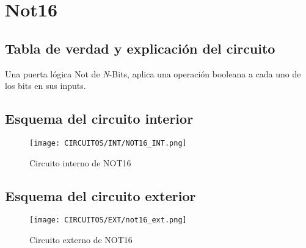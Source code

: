 \documentclass[12pt]{article}
\begin{document}
\section{Not16}
    \subsection{Tabla de verdad y explicación del circuito}

    Una puerta lógica Not de \textit{N}-Bits, aplica una operación booleana a cada uno de los bits en sus inputs. \cite{nisan_nand2tetris_2005}
    
        \begin{table}[H]
        \centering
        \caption{Tabla de verdad de NOT16}
        \label{tab:tab_not16}
        \end{table}


    \subsection{Esquema del circuito interior}
        \begin{figure}[H]
            \centering
            \texttt{[image: CIRCUITOS/INT/NOT16\_INT.png]}
            \caption{Circuito interno de NOT16 \cite{circuitverse}}
            \label{fig:not16_int}
        \end{figure}
    \subsection{Esquema del circuito exterior}
        \begin{figure}[H]
            \centering
            \texttt{[image: CIRCUITOS/EXT/not16\_ext.png]}
            \caption{Circuito externo de NOT16 \cite{circuitverse}}
            \label{fig:not16_ext}
        \end{figure}
\end{document}
